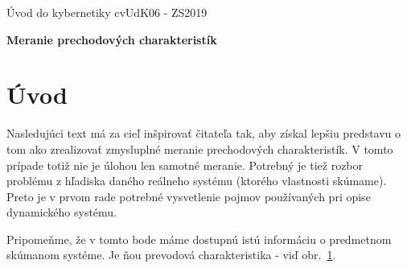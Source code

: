 \documentclass[a4paper, 10pt, ]{article}
\def\oznacenieCasti{cvUdK06 - ZS2019}
\begin{document}
\lstset{style=mystyle}


\fontsize{12pt}{22pt}\selectfont

\centerline{\textsf{Úvod do kybernetiky} \hfill \textsf{\oznacenieCasti}}

\fontsize{18pt}{22pt}\selectfont





\begin{flushleft}
    \textbf{\textsf{Meranie prechodových charakteristík}}
\end{flushleft}





\normalsize

\bigskip

\tableofcontents

\bigskip

\vspace{18pt}





\section{Úvod}


Nasledujúci text má za cieľ inšpirovať čitateľa tak, aby získal lepšiu predstavu o tom ako zrealizovať zmysluplné meranie prechodových charakteristík. V tomto prípade totiž nie je úlohou len samotné meranie. Potrebný je tiež rozbor problému z hľadiska daného reálneho systému (ktorého vlastnosti skúmame). Preto je v prvom rade potrebné vysvetlenie pojmov používaných pri opise dynamického systému.


Pripomeňme, že v tomto bode máme dostupnú istú informáciu o predmetnom skúmanom systéme. Je ňou prevodová charakteristika - viď obr.~\ref{Prevodová charakteristika graf}.



\begin{figure}[t]
	\centering


    \vspace{-4mm}

	\caption{}
	\label{Prevodová charakteristika graf}

\end{figure}
\end{document}
